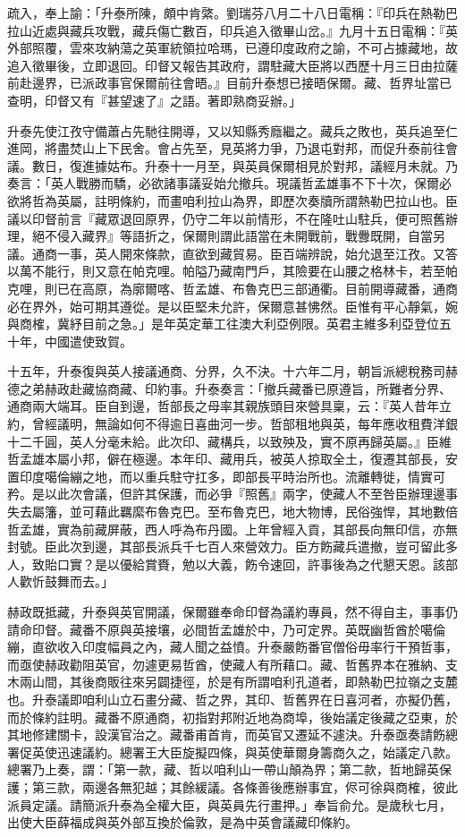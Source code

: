 \begin{pinyinscope}
疏入，奉上諭：「升泰所陳，頗中肯綮。劉瑞芬八月二十八日電稱：『印兵在熱勒巴拉山近處與藏兵攻戰，藏兵傷亡數百，印兵追入徵畢山岔。』九月十五日電稱：『英外部照覆，雲來攻納蕩之英軍統領拉哈瑪，已遵印度政府之諭，不可占據藏地，故追入徵畢後，立即退回。印督又報告其政府，謂駐藏大臣將以西歷十月三日由拉薩前赴邊界，已派政事官保爾前往會晤。』目前升泰想已接晤保爾。藏、哲界址當已查明，印督又有『甚望速了』之語。著即熟商妥辦。」

升泰先使江孜守備蕭占先馳往開導，又以知縣秀廕繼之。藏兵之敗也，英兵追至仁進岡，將盡焚山上下民舍。會占先至，見英將力爭，乃退屯對邦，而促升泰前往會議。數日，復進據姑布。升泰十一月至，與英員保爾相見於對邦，議經月未就。乃奏言：「英人戰勝而驕，必欲諸事議妥始允撤兵。現議哲孟雄事不下十次，保爾必欲將哲為英屬，註明條約，而畫咱利拉山為界，即歷次奏牘所謂熱勒巴拉山也。臣議以印督前言『藏眾退回原界，仍守二年以前情形，不在隆吐山駐兵，便可照舊辦理，絕不侵入藏界』等語折之，保爾則謂此語當在未開戰前，戰釁既開，自當另議。通商一事，英人開來條款，直欲到藏貿易。臣百端辨說，始允退至江孜。又答以萬不能行，則又意在帕克哩。帕隘乃藏南門戶，其險要在山腰之格林卡，若至帕克哩，則已在高原，為廓爾喀、哲孟雄、布魯克巴三部通衢。目前開導藏番，通商必在界外，始可期其遵從。是以臣堅未允許，保爾意甚怫然。臣惟有平心靜氣，婉與商榷，冀紓目前之急。」是年英定華工往澳大利亞例限。英君主維多利亞登位五十年，中國遣使致賀。

十五年，升泰復與英人接議通商、分界，久不決。十六年二月，朝旨派總稅務司赫德之弟赫政赴藏協商藏、印約事。升泰奏言：「撤兵藏番已原遵旨，所難者分界、通商兩大端耳。臣自到邊，哲部長之母率其親族頭目來營具稟，云：『英人昔年立約，曾經議明，無論如何不得逾日喜曲河一步。哲部租地與英，每年應收租費洋銀十二千圓，英人分毫未給。此次印、藏構兵，以致殃及，實不原再歸英屬。』臣維哲孟雄本屬小邦，僻在極邊。本年印、藏用兵，被英人掠取全土，復遷其部長，安置印度噶倫繃之地，而以重兵駐守扛多，即部長平時治所也。流離轉徙，情實可矜。是以此次會議，但許其保護，而必爭『照舊』兩字，使藏人不至咎臣辦理邊事失去屬籓，並可藉此羈縻布魯克巴。至布魯克巴，地大物博，民俗強悍，其地數倍哲孟雄，實為前藏屏蔽，西人呼為布丹國。上年曾經入貢，其部長向無印信，亦無封號。臣此次到邊，其部長派兵千七百人來營效力。臣方飭藏兵遣撤，豈可留此多人，致貽口實？是以優給賞賚，勉以大義，飭令速回，許事後為之代懇天恩。該部人歡忻鼓舞而去。」

赫政既抵藏，升泰與英官開議，保爾雖奉命印督為議約專員，然不得自主，事事仍請命印督。藏番不原與英接壤，必間哲孟雄於中，乃可定界。英既幽哲酋於噶倫繃，直欲收入印度幅員之內，藏人聞之益憤。升泰嚴飭番官僧俗毋率行干預哲事，而亟使赫政勸阻英官，勿遽更易哲酋，使藏人有所藉口。藏、哲舊界本在雅納、支木兩山間，其後商販往來另闢捷徑，於是有所謂咱利孔道者，即熱勒巴拉嶺之支麓也。升泰議即咱利山立石畫分藏、哲之界，其印、哲舊界在日喜河者，亦擬仍舊，而於條約註明。藏番不原通商，初指對邦附近地為商埠，後始議定後藏之亞東，於其地修建關卡，設漢官治之。藏番甫首肯，而英官又遷延不遽決。升泰亟奏請飭總署促英使迅速議約。總署王大臣旋擬四條，與英使華爾身籌商久之，始議定八款。總署乃上奏，謂：「第一款，藏、哲以咱利山一帶山顛為界；第二款，哲地歸英保護；第三款，兩邊各無犯越；其餘緩議。各條善後應辦事宜，侭可徐與商榷，彼此派員定議。請簡派升泰為全權大臣，與英員先行畫押。」奉旨俞允。是歲秋七月，出使大臣薛福成與英外部互換於倫敦，是為中英會議藏印條約。


\end{pinyinscope}
